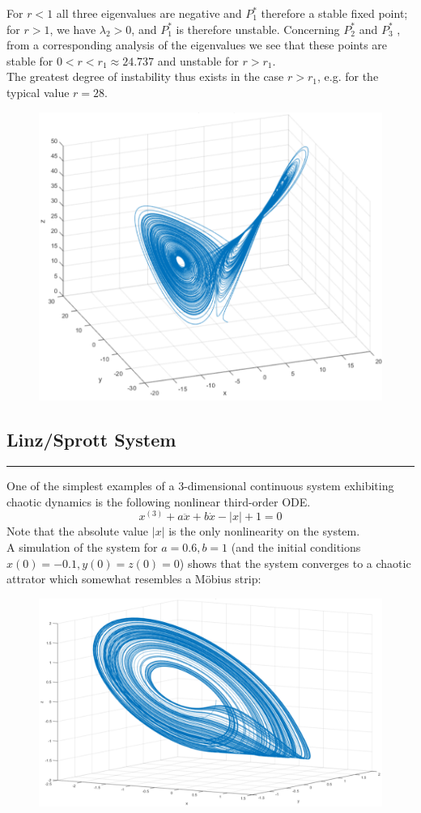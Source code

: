 For $r < 1$ all three eigenvalues are negative and $P_1^*$ therefore a stable fixed point; for $r > 1$, we have $\lambda_2 > 0$, and $P_1^*$ is therefore unstable. Concerning $P_2^*$ and $P_3^*$ , from a corresponding analysis of the eigenvalues we see that these points are stable for $0 < r < r_1 \approx 24.737$ and unstable for $r > r_1$.\\

The greatest degree of instability thus exists in the case $r > r_1$, e.g. for the typical value $r = 28$.

\begin{figure}[H]
  \centering
  \includegraphics[width=.7\linewidth]{Pics/4.54.png}
\end{figure}

\subsection{Linz/Sprott System}
\noindent\rule[\linienAbstand]{\linewidth}{\linienDicke}
One of the simplest examples of a 3-dimensional continuous system exhibiting chaotic dynamics is the following nonlinear third-order ODE.
\begin{equation}
  x^{(3)} + a \ddot{x} + b\dot{x} - |x| + 1 = 0
\end{equation}
Note that the absolute value $|x|$ is the only nonlinearity on the system.\\
A simulation of the system for $a = 0.6, b = 1$ (and the initial conditions $x(0) = -0.1, y(0) = z(0) = 0$) shows that the system converges to a chaotic attrator which somewhat resembles a Möbius strip:

\begin{figure}[H]
  \centering
  \includegraphics[width=.7\linewidth]{Pics/4.58.png}
\end{figure}
